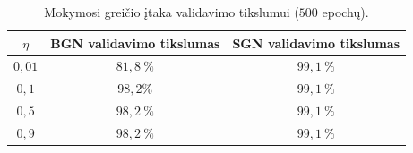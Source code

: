 \begin{table}[H]
    \centering
    \caption{Mokymosi greičio įtaka validavimo tikslumui ($500$ epochų).}
    \begin{tabular}{|c|c|c|}
        \hline
        $\eta$ & BGN validavimo tikslumas & SGN validavimo tikslumas \\
        \hline
        $0{,}01$ & $81{,}8\ \%$ & $99{,}1\ \%$ \\ \hline
        $0{,}1$ & $98{,}2\%$ & $99{,}1\ \%$ \\ \hline
        $0{,}5$ & $98{,}2\ \%$ & $99{,}1\ \%$ \\ \hline
        $0{,}9$ & $98{,}2\ \%$ & $99{,}1\ \%$ \\ \hline
    \end{tabular}
    \label{tab:lr_comparison}
\end{table}